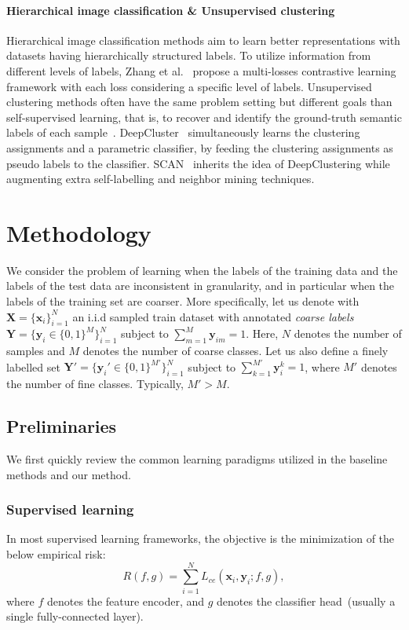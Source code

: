 \documentclass[10pt,twocolumn,letterpaper]{article}
\def\vx{{\bm{x}}}
\def\vy{{\bm{y}}}
\def\mX{{\bm{X}}}
\def\mY{{\bm{Y}}}
\begin{document}
\paragraph{Hierarchical image classification \& Unsupervised clustering}
Hierarchical image classification methods aim to learn better representations with datasets having hierarchically structured labels. To utilize information from different levels of labels,  Zhang et al.~\cite{zhang2022hierarchical_alllabels} propose a multi-losses contrastive learning framework with each loss considering a specific level of labels.
Unsupervised clustering methods often have the same problem setting but different goals than self-supervised learning, that is, to recover and identify the ground-truth semantic labels of each sample~\cite{caron2018deepclustering, van2020scan}. DeepCluster~\cite{caron2018deepclustering} simultaneously learns the clustering assignments and a parametric classifier, by feeding the clustering assignments as pseudo labels to the classifier. SCAN~\cite{van2020scan} inherits the idea of DeepClustering while augmenting extra self-labelling and neighbor mining techniques.

\section{Methodology}\label{method}
We consider the problem of learning when the labels of the training data and the labels of the test data are inconsistent in granularity, and in particular when the labels of the training set are coarser. More specifically, let us denote with $\mX = \{\vx_i\}_{i=1}^N$ an i.i.d sampled train dataset with annotated \textit{coarse labels} $\mY = \{\vy_i \in \{0, 1\}^M\}_{i=1}^N$ subject to $\sum_{m=1}^M \vy_{im} = 1$. Here, $N$ denotes the number of samples and $M$ denotes the number of coarse classes. Let us also define a finely labelled set $\mY' = \{\vy_i' \in \{0, 1\}^{M'}\}_{i=1}^N$ subject to $\sum_{k=1}^{M'} \vy_i^k = 1$, where $M'$ denotes the number of fine classes. Typically, $M' > M$. 

\subsection{Preliminaries}\label{method_pre}
We first quickly review the common learning paradigms utilized in the baseline methods and our method.
\subsubsection{Supervised learning}\label{method_pre_supervised}
In most supervised learning frameworks, the objective is the minimization of the below empirical risk:
\begin{equation}\label{eq:cerisk}
    R(f, g) = \sum_{i=1}^N L_{ce}(\vx_i, \vy_i; f, g),
\end{equation}
where $f$ denotes the feature encoder, and $g$ denotes the classifier head~(usually a single fully-connected layer).
\end{document}
